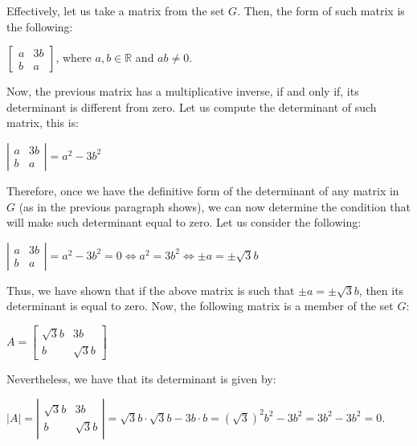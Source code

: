 \documentclass[a4paper,openany,11pt]{book}
\begin{document}
Effectively, let us take a matrix from the set $G$. Then, the form of such matrix is the following:

\begin{center}
	$\left[\begin{array}{cc}
	a & 3b\\
	b & a
	\end{array}\right]$, \hspace{0.1cm} where $a, b \in \mathbb{R}$ and $ab \neq 0$.
\end{center}

Now, the previous matrix has a multiplicative inverse, if and only if, its determinant is different from zero. Let us compute the determinant of such matrix, this is:

\begin{center}
	$\left|\begin{array}{cc}
	a & 3b\\
	b & a
	\end{array}\right| = a^{2} - 3b^{2}$
\end{center}

Therefore, once we have the definitive form of the determinant of any matrix in $G$ (as in the previous paragraph shows), we can now determine the condition that will make such determinant equal to zero. Let us consider the following:

\begin{center}
	$\left|\begin{array}{cc}
	a & 3b\\
	b & a
	\end{array}\right| = a^{2} - 3b^{2} = 0 \iff  a^{2} = 3b^{2} \iff \pm a = \pm\sqrt{3}b$
\end{center} 

Thus, we have shown that if the above matrix is such that $\pm a = \pm\sqrt{3}b$, then its determinant is equal to zero. Now, the following matrix is a member of the set $G$:

\begin{center}
	$A = \left[\begin{array}{cc}
	\sqrt{3}b & 3b\\
	b & \sqrt{3}b
	\end{array}\right]$
\end{center}

Nevertheless, we have that its determinant is given by:

\begin{center}
	$\left|A\right| = \left|\begin{array}{cc}
		\sqrt{3}b & 3b\\
		b & \sqrt{3}b
	\end{array}\right| = \sqrt{3}b\cdot\sqrt{3}b - 3b\cdot b = (\sqrt{3})^{2}b^{2} - 3b^{2} = 3b^{2} - 3b^{2} = 0$.
\end{center}
\end{document}
